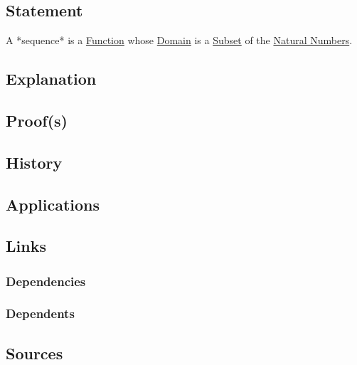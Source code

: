 \subsection{Statement}
A *sequence* is a \hyperref[articles:set-theory:function]{Function} whose \hyperref[articles:set-theory:domain-of-a-function]{Domain} is a \hyperref[articles:set-theory:subset]{Subset} of the \hyperref[articles:set-theory:natural-numbers]{Natural Numbers}.

\subsection{Explanation}

\subsection{Proof(s)}

\subsection{History}

\subsection{Applications}

\subsection{Links}
\subsubsection{Dependencies}
\subsubsection{Dependents}

\subsection{Sources}

